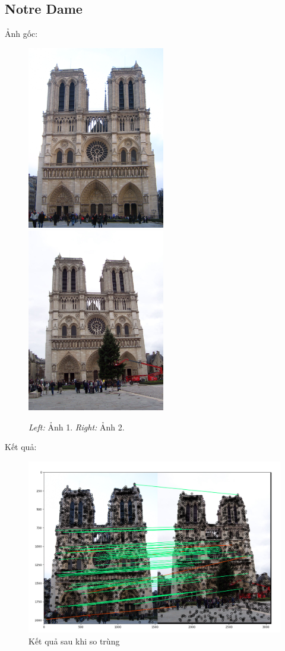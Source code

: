 \documentclass[11pt]{article}
\begin{document}
\subsection*{Notre Dame}
Ảnh gốc:
\begin{figure}[H]
    \centering
    \includegraphics[width=6cm]{images/notre_dame/NotreDame1.jpg}
    \includegraphics[width=6cm]{images/notre_dame/NotreDame2.jpg}
    \caption{\emph{Left:} Ảnh 1. \emph{Right:} Ảnh 2.}
\end{figure}
Kết quả:
\begin{figure}[H]
    \centering
    \includegraphics[width=15cm]{images/notre_dame/Figure_1.png}
    \caption{Kết quả sau khi so trùng}
\end{figure}
\end{document}
